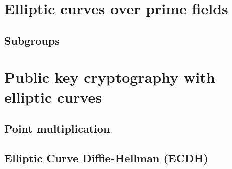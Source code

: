 \documentclass[a4paper]{article}
\begin{document}
\section{Elliptic curves over prime fields}

\subsection{Subgroups}


\section{Public key cryptography with elliptic curves}

\subsection{Point multiplication}

\subsection{Elliptic Curve Diffie-Hellman (ECDH)}


\newpage


\end{document}
